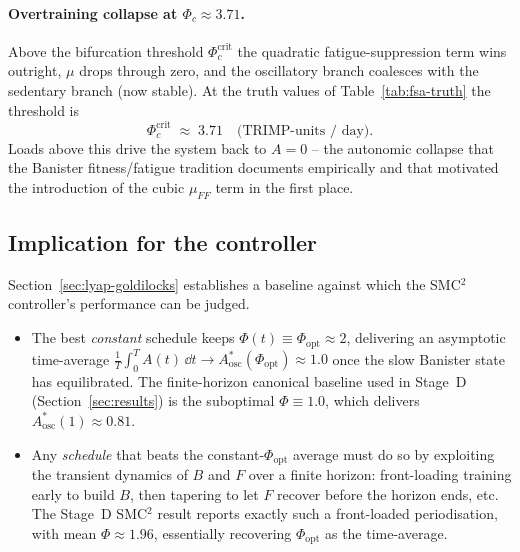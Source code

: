 \paragraph{Overtraining collapse at $\Phi_c \approx 3.71$.} Above
the bifurcation threshold $\Phi_c^{\mathrm{crit}}$ the quadratic
fatigue-suppression term wins outright, $\mu$ drops through zero,
and the oscillatory branch coalesces with the sedentary branch
(now stable). At the truth values of Table~\ref{tab:fsa-truth} the
threshold is
\begin{equation}
  \Phi_c^{\mathrm{crit}} \;\approx\; 3.71
  \quad \text{(TRIMP-units / day)}.
  \label{eq:Phi-crit}
\end{equation}
Loads above this drive the system back to $A=0$ -- the autonomic
collapse that the Banister fitness/fatigue tradition documents
empirically and that motivated the introduction of the cubic
$\mu_{FF}$ term in the first place.

\subsection{Implication for the controller}\label{sec:lyap-implication}

Section~\ref{sec:lyap-goldilocks} establishes a baseline against
which the SMC${}^2$ controller's performance can be judged.

\begin{itemize}
  \item The best \emph{constant} schedule keeps $\Phi(t) \equiv \Phi_{\mathrm{opt}} \approx 2$,
        delivering an asymptotic time-average
        $\frac{1}{T}\int_0^T A(t)\,\dd t \to A^*_{\mathrm{osc}}(\Phi_{\mathrm{opt}}) \approx 1.0$
        once the slow Banister state has equilibrated. The
        finite-horizon canonical baseline used in Stage~D
        (Section~\ref{sec:results}) is the suboptimal
        $\Phi \equiv 1.0$, which delivers
        $A^*_{\mathrm{osc}}(1) \approx 0.81$.
  \item Any \emph{schedule} that beats the constant-$\Phi_{\mathrm{opt}}$
        average must do so by exploiting the transient dynamics of
        $B$ and $F$ over a finite horizon: front-loading training
        early to build $B$, then tapering to let $F$ recover before
        the horizon ends, etc. The Stage~D SMC${}^2$ result
        reports exactly such a front-loaded periodisation, with
        mean $\Phi \approx 1.96$, essentially recovering
        $\Phi_{\mathrm{opt}}$ as the time-average.
\end{itemize}

